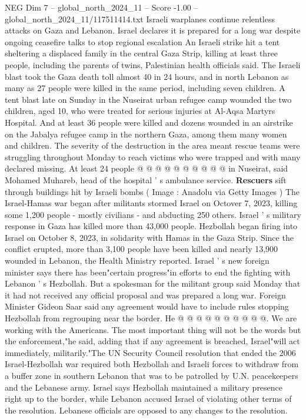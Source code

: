 \begin{textsample}{NEG Dim 7 – global\_north\_2024\_11 – Score -1.00 – global\_north\_2024\_11/117511414.txt}  \label{ex:f7_neg_344}
Israeli warplanes continue relentless attacks on Gaza and Lebanon.
Israel declares it is prepared for a long war despite ongoing ceasefire talks to stop regional escalation An Israeli strike hit a tent sheltering a displaced family in the central Gaza Strip, killing at least three people, including the parents of twins, Palestinian health officials said.
The Israeli blast took the Gaza death toll almost 40 in 24 hours, and in north Lebanon as many as 27 people were killed in the same period, including seven children.
A tent blast late on Sunday in the Nuseirat urban refugee camp wounded the two children, aged 10, who were treated for serious injuries at Al-Aqsa Martyrs Hospital.
And at least 36 people were killed and dozens wounded in an airstrike on the Jabalya refugee camp in the northern Gaza, among them many women and children.
The severity of the destruction in the area meant rescue teams were struggling throughout Monday to reach victims who were trapped and with many declared missing.
At least 24 people @ @ @ @ @ @ @ @ @ @ in Nuseirat, said Mohamed Muhareb, head of the hospital ' s ambulance service. \textbf{Rescuers} sift through buildings hit by Israeli bombs ( Image : Anadolu via Getty Images ) The Israel-Hamas war began after militants stormed Israel on Octover 7, 2023, killing some 1,200 people - mostly civilians - and abducting 250 others.
Israel ' s military response in Gaza has killed more than 43,000 people.
Hezbollah began firing into Israel on October 8, 2023, in solidarity with Hamas in the Gaza Strip.
Since the conflict erupted, more than 3,100 people have been killed and nearly 13,900 wounded in Lebanon, the Health Ministry reported.
Israel ' s new foreign minister says there has been"certain progress"in efforts to end the fighting with Lebanon ' s Hezbollah.
But a spokesman for the militant group said Monday that it had not received any official proposal and was prepared a long war.
Foreign Minister Gideon Saar said any agreement would have to include rules stopping Hezbollah from regrouping near the border.
He @ @ @ @ @ @ @ @ @ @.
We are working with the Americans.
The most important thing will not be the words but the enforcement,"he said, adding that if any agreement is breached, Israel"will act immediately, militarily."The UN Security Council resolution that ended the 2006 Israel-Hezbollah war required both Hezbollah and Israeli forces to withdraw from a buffer zone in southern Lebanon that was to be patrolled by U.N. peacekeepers and the Lebanese army.
Israel says Hezbollah maintained a military presence right up to the border, while Lebanon accused Israel of violating other terms of the resolution.
Lebanese officials are opposed to any changes to the resolution.

\end{textsample}
